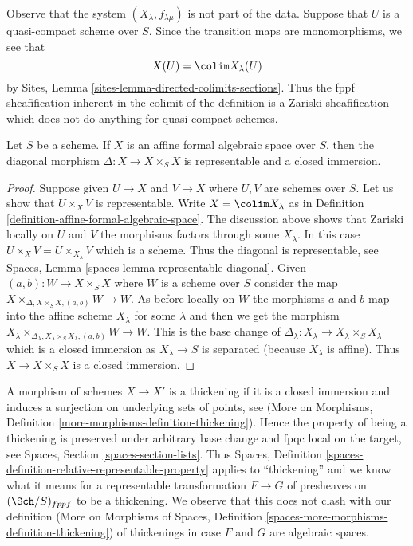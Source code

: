 \noindent
Observe that the system $(X_\lambda, f_{\lambda \mu})$ is not
part of the data. Suppose that $U$ is a quasi-compact scheme over $S$.
Since the transition maps are monomorphisms, we see that
$$
X(U) = \colim X_\lambda(U)
$$
by Sites, Lemma \ref{sites-lemma-directed-colimits-sections}.
Thus the fppf sheafification inherent in the colimit of the
definition is a Zariski sheafification which does not do
anything for quasi-compact schemes.

\begin{lemma}
\label{lemma-diagonal-affine-formal-algebraic-space}
Let $S$ be a scheme. If $X$ is an affine formal algebraic space over
$S$, then the diagonal morphism $\Delta : X \to X \times_S X$
is representable and a closed immersion.
\end{lemma}

\begin{proof}
Suppose given $U \to X$ and $V \to X$ where $U, V$ are schemes over $S$.
Let us show that $U \times_X V$ is representable. Write $X = \colim X_\lambda$
as in Definition \ref{definition-affine-formal-algebraic-space}.
The discussion above shows that Zariski locally on $U$ and $V$ the morphisms
factors through some $X_\lambda$. In this case
$U \times_X V = U \times_{X_\lambda} V$ which is a scheme.
Thus the diagonal is representable, see
Spaces, Lemma \ref{spaces-lemma-representable-diagonal}.
Given $(a, b) : W \to X \times_S X$ where $W$ is a scheme over $S$
consider the map $X \times_{\Delta, X \times_S X, (a, b)} W \to W$.
As before locally on $W$ the morphisms $a$ and $b$ map into
the affine scheme $X_\lambda$ for some $\lambda$ and then
we get the morphism
$X_\lambda
\times_{\Delta_\lambda, X_\lambda \times_S X_\lambda, (a, b)} W \to W$.
This is the base change of
$\Delta_\lambda : X_\lambda \to X_\lambda \times_S X_\lambda$
which is a closed immersion as $X_\lambda \to S$ is separated
(because $X_\lambda$ is affine).
Thus $X \to X \times_S X$ is a closed immersion.
\end{proof}

\noindent
A morphism of schemes $X \to X'$ is a thickening if it is a closed immersion
and induces a surjection on underlying sets of points, see
(More on Morphisms, Definition
\ref{more-morphisms-definition-thickening}).
Hence the property of being a thickening is preserved under arbitrary
base change and fpqc local on the target, see
Spaces, Section \ref{spaces-section-lists}.
Thus Spaces, Definition \ref{spaces-definition-relative-representable-property}
applies to ``thickening'' and we know what it means for a
representable transformation $F \to G$ of
presheaves on $(\Sch/S)_{fppf}$ to be a thickening.
We observe that this does not clash with our definition
(More on Morphisms of Spaces, Definition
\ref{spaces-more-morphisms-definition-thickening})
of thickenings in case $F$ and $G$ are algebraic spaces.

